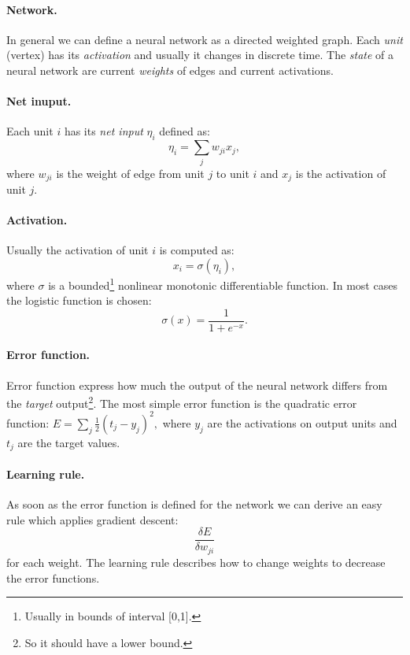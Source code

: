 
\paragraph{Network.}
In general we can define a neural network as a directed weighted graph. Each \emph{unit} (vertex) has its \emph{activation} and usually it changes in discrete time. The \emph{state} of a neural network are current \emph{weights} of edges and current activations. 

\paragraph{Net inuput.}
Each unit $i$ has its \emph{net input} $\eta_i$ defined as:
$$\eta_i = \sum_j w_{ji}x_j,$$
where $w_{ji}$ is the weight of edge from unit $j$ to unit $i$ and $x_j$ is the activation of unit $j$.

\paragraph{Activation.}
Usually the activation of unit $i$ is computed as:
$$x_i = \sigma(\eta_i),$$
where $\sigma$ is a bounded\footnote{
Usually in bounds of interval [0,1].
} nonlinear monotonic differentiable function. In most cases the logistic function is chosen:
$$\sigma(x) = \frac{1}{1 + e^{-x}}.$$

\paragraph{Error function.}
Error function express how much the output of the neural network differs from the \emph{target} output\footnote{
So it should have a lower bound. 
}. The most simple error function is the quadratic error function:
$E = \sum_j \frac{1}{2}(t_j-y_j)^2,$
where $y_j$ are the activations on output units and $t_j$ are the target values.

\paragraph{Learning rule.}
As soon as the error function is defined for the network we can derive an easy rule which applies gradient descent: 
$$\frac{\delta E}{\delta w_{ji}}$$
for each weight. The learning rule describes how to change weights to decrease the error functions.

